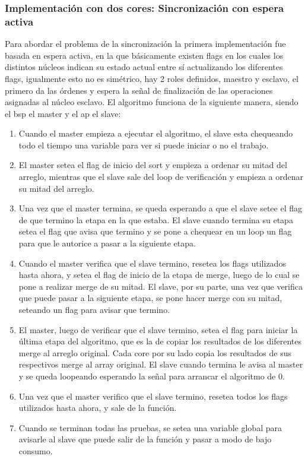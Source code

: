     \subsubsection{Implementación con dos cores: Sincronización con espera activa}
    	Para abordar el problema de la sincronización la primera implementación fue basada en espera activa, en la que básicamente existen flags en los cuales los distintos núcleos indican su estado actual entre sí actualizando los diferentes flags, igualmente esto no es simétrico, hay 2 roles definidos, maestro y esclavo, el primero da las órdenes y espera la señal de finalización de las operaciones asignadas al núcleo esclavo.
    	El algoritmo funciona de la siguiente manera, siendo el bsp el master y el ap el slave:
    	\begin{enumerate}
    		\item Cuando el master empieza a ejecutar el algoritmo, el slave esta chequeando todo el tiempo una variable para ver si puede iniciar o no el trabajo.
    		
    		\item El master setea el flag de inicio del sort y empieza a ordenar su mitad del arreglo, mientras que el slave sale del loop de verificación y empieza a ordenar su mitad del arreglo.
    		
    		\item Una vez que el master termina, se queda esperando a que el slave setee el flag de que termino la etapa en la que estaba. El slave cuando termina su etapa setea el flag que avisa que termino y se pone a chequear en un loop un flag para que le autorice a pasar a la siguiente etapa.

    		\item Cuando el master verifica que el slave termino, resetea los flags utilizados hasta ahora, y setea el flag de inicio de la etapa de merge, luego de lo cual se pone a realizar merge de su mitad. El slave, por su parte, una vez que verifica que puede pasar a la siguiente etapa, se pone hacer merge con su mitad, seteando un flag para avisar que termino.

    		\item El master, luego de verificar que el slave termino, setea el flag para iniciar la última etapa del algoritmo, que es la de copiar los resultados de los diferentes merge al arreglo original. Cada core por su lado copia los resultados de sus respectivos merge al array original. El slave cuando termina le avisa al master y se queda loopeando esperando la señal para arrancar el algoritmo de 0.

    		\item Una vez que el master verifico que el slave termino, resetea todos los flags utilizados hasta ahora, y sale de la función.

			\item Cuando se terminan todas las pruebas, se setea una variable global para avisarle al slave que puede salir de la función y pasar a modo de bajo consumo.
    	\end{enumerate}

